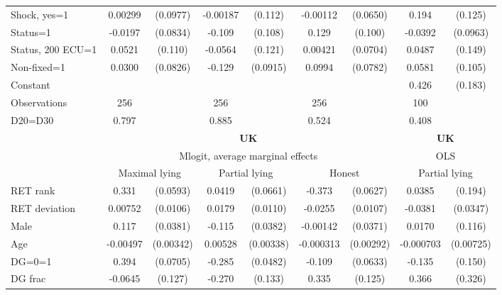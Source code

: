 \begin{tabular}{l|cccccc|cc}
Shock, yes=1    &  0.00299         & (0.0977)& -0.00187         &  (0.112)& -0.00112         & (0.0650)&    0.194         &  (0.125)\\
Status=1        &  -0.0197         & (0.0834)&   -0.109         &  (0.108)&    0.129         &  (0.100)&  -0.0392         & (0.0963)\\
Status, 200 ECU=1&   0.0521         &  (0.110)&  -0.0564         &  (0.121)&  0.00421         & (0.0704)&   0.0487         &  (0.149)\\
Non-fixed=1     &   0.0300         & (0.0826)&   -0.129         & (0.0915)&   0.0994         & (0.0782)&   0.0581         &  (0.105)\\
Constant        &                  &         &                  &         &                  &         &    0.426\sym{**} &  (0.183)\\
\hline
Observations    &      256         &         &      256         &         &      256         &         &      100         &         \\
D20=D30         &    0.797         &         &    0.885         &         &    0.524         &         &    0.408         &         \\
\hline\hline
&\multicolumn{6}{c|}{\bf UK}&\multicolumn{2}{c}{\bf UK}\\ &\multicolumn{6}{c|}{Mlogit, average marginal effects }&\multicolumn{2}{c}{OLS}\\
                &\multicolumn{2}{c}{Maximal lying}&\multicolumn{2}{c}{Partial lying}&\multicolumn{2}{c}{Honest}  &\multicolumn{2}{c}{Partial lying}\\
\hline
RET rank        &    0.331\sym{***}& (0.0593)&   0.0419         & (0.0661)&   -0.373\sym{***}& (0.0627)&   0.0385         &  (0.194)\\
RET deviation   &  0.00752         & (0.0106)&   0.0179         & (0.0110)&  -0.0255\sym{**} & (0.0107)&  -0.0381         & (0.0347)\\
Male            &    0.117\sym{***}& (0.0381)&   -0.115\sym{***}& (0.0382)& -0.00142         & (0.0371)&   0.0170         &  (0.116)\\
Age             & -0.00497         &(0.00342)&  0.00528         &(0.00338)&-0.000313         &(0.00292)&-0.000703         &(0.00725)\\
DG=0=1          &    0.394\sym{***}& (0.0705)&   -0.285\sym{***}& (0.0482)&   -0.109\sym{*}  & (0.0633)&   -0.135         &  (0.150)\\
DG frac         &  -0.0645         &  (0.127)&   -0.270\sym{**} &  (0.133)&    0.335\sym{***}&  (0.125)&    0.366         &  (0.326)\\

\end{tabular}
